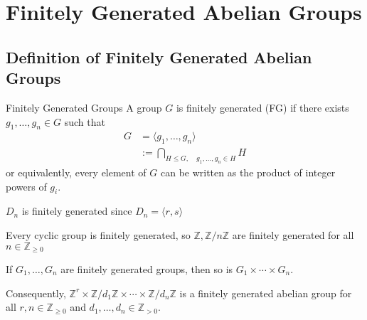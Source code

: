 \documentclass{article}
\begin{document}
\newpage
\section{Finitely Generated Abelian Groups}
\subsection{Definition of Finitely Generated Abelian Groups}
\begin{definition}{Finitely Generated Groups}
    A group $G$ is finitely generated (FG) if there exists $g_1,\dots,g_n \in G$ such that
    \begin{align*}
        G & = \langle g_1,\dots, g_n\rangle                  \\
          & := \bigcap_{H \le G,\quad g_1,\dots,g_n \in H} H
    \end{align*}
    or equivalently, every element of $G$ can be written as the product of integer powers of $g_i$.
\end{definition}
\begin{example}
    $D_n$ is finitely generated since $D_n = \langle r,s \rangle$
\end{example}
\begin{example}
    Every cyclic group is finitely generated, so $\mathbb{Z}, \mathbb{Z}/n\mathbb{Z}$ are finitely generated for all $n\in \mathbb{Z}_{\ge 0}$
\end{example}
\begin{example}
    If $G_1,\dots,G_n$ are finitely generated groups, then so is $G_1 \times \cdots \times G_n$.

    Consequently, $\mathbb{Z}^r \times \mathbb{Z}/d_1\mathbb{Z} \times \cdots \times \mathbb{Z}/d_n\mathbb{Z}$ is a finitely generated abelian group for all $r,n \in \mathbb{Z}_{\ge 0}$ and $d_1,\dots,d_n \in \mathbb{Z}_{>0}$.
\end{example}
\end{document}
